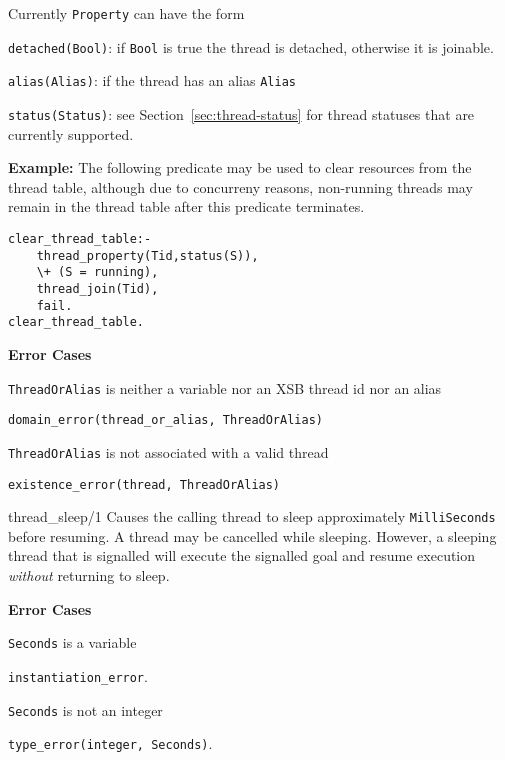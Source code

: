 \begin{description}
Currently {\tt Property} can have the form 
\bi
\item {\tt detached(Bool)}: if {\tt Bool} is true the thread is
  detached, otherwise it is joinable.
%
\item {\tt alias(Alias)}: if the thread has an alias {\tt Alias}
%
\item {\tt status(Status)}: see Section~\ref{sec:thread-status} for
  thread statuses that are currently supported.
\ei

{\bf Example:} The following predicate may be used to clear resources
from the thread table, although due to concurreny reasons, non-running
threads may remain in the thread table after this predicate
terminates.
\begin{verbatim}
clear_thread_table:- 
    thread_property(Tid,status(S)),
    \+ (S = running),
    thread_join(Tid),
    fail.
clear_thread_table.
\end{verbatim}

{\bf Error Cases}
%
\bi
\item {\tt ThreadOrAlias} is neither a variable nor an XSB thread id
  nor an alias
\bi
\item {\tt domain\_error(thread\_or\_alias, ThreadOrAlias)}
\ei
\item {\tt ThreadOrAlias} is not associated with a valid thread
\bi
\item {\tt existence\_error(thread, ThreadOrAlias)}
\ei
\ei

{thread\_sleep/1}
%
Causes the calling thread to sleep approximately {\tt MilliSeconds}
before resuming.  A thread may be cancelled while sleeping.  However,
a sleeping thread that is signalled will execute the signalled goal
and resume execution {\em without} returning to sleep.

{\bf Error Cases}
\bi
\item 	{\tt Seconds} is a variable
\bi
\item 	{\tt instantiation\_error}.
\ei
\item 	{\tt Seconds} is not an integer
\bi
\item 	{\tt type\_error(integer, Seconds)}.
\ei
\ei



% 
\end{description}

